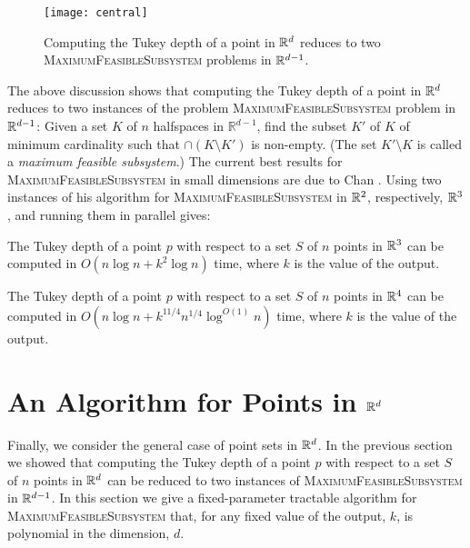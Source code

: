 \documentclass[charterfonts,lotsofwhite]{patmorin}
\begin{document}
\begin{figure}
\begin{center}\texttt{[image: central]}\end{center}
\caption{Computing the Tukey depth of a point in $\mathbb{R}^d$ reduces to two
\textsc{MaximumFeasibleSubsystem} problems in $\mathbb{R}^{d-1}$.}
\end{figure}

The above discussion shows that computing the Tukey depth of a point
in $\mathbb{R}^d$ reduces to two instances of the problem
\textsc{MaximumFeasibleSubsystem} problem in $\mathbb{R}^{d-1}$: Given a set
$K$ of $n$ halfspaces in $\mathbb{R}^{d-1}$, find the subset $K'$ of
$K$ of minimum cardinality such that $\cap (K\setminus K')$ is
non-empty. (The set $K'\setminus K$ is called a \emph{maximum feasible
subsystem}.)  The current best results for
\textsc{MaximumFeasibleSubsystem} in small dimensions are due to Chan
\cite{c05}.  Using two instances of his algorithm for
\textsc{MaximumFeasibleSubsystem} in $\mathbb{R}^2$, respectively, $\mathbb{R}^3$, and
running them in parallel gives:

\begin{thm}
The Tukey depth of a point $p$ with respect to a set $S$ of $n$ points
in $\mathbb{R}^3$ can be computed in $O(n\log n + k^2\log n)$ time, where
$k$ is the value of the output.
\end{thm}


\begin{thm}
The Tukey depth of a point $p$ with respect to a set $S$ of $n$ points
in $\mathbb{R}^4$ can be computed in $O(n\log n + k^{11/4}n^{1/4}\log^{O(1)}
n)$ time, where $k$ is the value of the output.
\end{thm}

\section{An Algorithm for Points in $\mathbb{R}^d$}

Finally, we consider the general case of point sets in $\mathbb{R}^d$.  In the
previous section we showed that computing the Tukey depth of a point
$p$ with respect to a set $S$ of $n$ points in $\mathbb{R}^d$ can be reduced
to two instances of \textsc{MaximumFeasibleSubsystem} in $\mathbb{R}^{d-1}$.
In this section we give a fixed-parameter tractable \cite{df98}
algorithm for \textsc{MaximumFeasibleSubsystem} that, for any fixed
value of the output, $k$, is polynomial in the dimension, $d$.   
\end{document}
